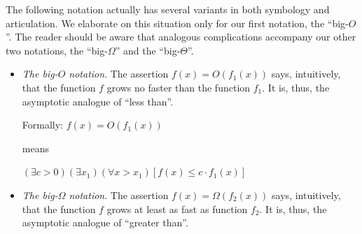 The following notation actually has several variants in both symbology
and articulation.  We elaborate on this situation only for our first
notation, the ``big-$O$''.  The reader should be aware that analogous
complications accompany our other two notations, the ``big-$\Omega$''
and the ``big-$\Theta$''. 
\begin{itemize}
\item
{\em The big-$O$ notation}.
%
The assertion $f(x) = O(f_1(x))$ says, intuitively, that the function
$f$ grows no faster than the function $f_1$.  It is, thus, the asymptotic
analogue of ``less than''.

Formally:
$f(x) = O(f_1(x))$

means

$(\exists c >0)(\exists x_1)(\forall x > x_1)
[f(x) \leq c \cdot f_1(x)]$

\smallskip

\noindent {}
\medskip

\item
{\em The big-$\Omega$ notation}.
%
The assertion $f(x) = \Omega(f_2(x))$ says, intuitively, that the
function $f$ grows at least as fast as function $f_2$.  It is, thus, the
asymptotic analogue of ``greater than''.


\end{itemize}
